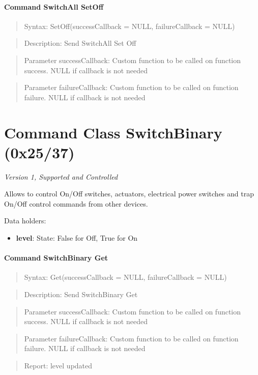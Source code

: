 \paragraph{Command SwitchAll SetOff}
\begin{quote}Syntax: SetOff(successCallback = NULL, failureCallback = NULL)\end{quote}
\begin{quote}Description: Send SwitchAll Set Off\end{quote}
\begin{quote}Parameter successCallback: Custom function to be called on function success. NULL if callback is not needed\end{quote}
\begin{quote}Parameter failureCallback: Custom function to be called on function failure. NULL if callback is not needed\end{quote}



\section{Command Class SwitchBinary (0x25/37)}

\textit{Version 1, Supported and Controlled}
\newline

Allows to control On/Off switches, actuators, electrical power switches and trap On/Off control commands from other devices.
\newline

\noindent
Data holders:

\begin{itemize}
\item \textbf{level}: State: False for Off, True for On
\end{itemize}

\paragraph{Command SwitchBinary Get}
\begin{quote}Syntax: Get(successCallback = NULL, failureCallback = NULL)\end{quote}
\begin{quote}Description: Send SwitchBinary Get\end{quote}
\begin{quote}Parameter successCallback: Custom function to be called on function success. NULL if callback is not needed\end{quote}
\begin{quote}Parameter failureCallback: Custom function to be called on function failure. NULL if callback is not needed\end{quote}
\begin{quote}Report: level updated\end{quote}

